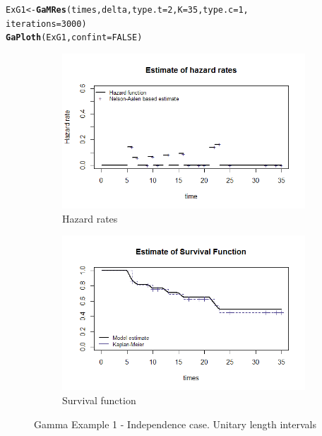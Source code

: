 \documentclass[letterpaper]{article}\usepackage[]{graphicx}\usepackage[]{color}
\makeatletter
\newcommand{\hlnum}[1]{\textcolor[rgb]{0.686,0.059,0.569}{#1}}%
\newcommand{\hlstd}[1]{\textcolor[rgb]{0.345,0.345,0.345}{#1}}%
\newcommand{\hlkwb}[1]{\textcolor[rgb]{0.69,0.353,0.396}{#1}}%
\newcommand{\hlkwc}[1]{\textcolor[rgb]{0.333,0.667,0.333}{#1}}%
\newcommand{\hlkwd}[1]{\textcolor[rgb]{0.737,0.353,0.396}{\textbf{#1}}}%
\newenvironment{kframe}{%
 \def\at@end@of@kframe{}%
 \ifinner\ifhmode%
  \def\at@end@of@kframe{\end{minipage}}%
  \begin{minipage}{\columnwidth}%
 \fi\fi%
 \def\FrameCommand##1{\hskip\@totalleftmargin \hskip-\fboxsep
 \colorbox{shadecolor}{##1}\hskip-\fboxsep
     \hskip-\linewidth \hskip-\@totalleftmargin \hskip\columnwidth}%
 \MakeFramed {\advance\hsize-\width
   \@totalleftmargin\z@ \linewidth\hsize
   \@setminipage}}%
 {\par\unskip\endMakeFramed%
 \at@end@of@kframe}
\newenvironment{knitrout}{}{} %
\makeatother
\begin{document}
\begin{knitrout}
\color{fgcolor}\begin{kframe}
\begin{alltt}
\hlstd{ExG1} \hlkwb{<-} \hlkwd{GaMRes}\hlstd{(times, delta,} \hlkwc{type.t} \hlstd{=} \hlnum{2}\hlstd{,} \hlkwc{K} \hlstd{=} \hlnum{35}\hlstd{,} \hlkwc{type.c} \hlstd{=} \hlnum{1}\hlstd{,}
               \hlkwc{iterations} \hlstd{=} \hlnum{3000}\hlstd{)}
\hlkwd{GaPloth}\hlstd{(ExG1,} \hlkwc{confint} \hlstd{=} \hlnum{FALSE}\hlstd{)}
\end{alltt}
\end{kframe}
\end{knitrout}
\begin{figure}
  \centering
  \begin{subfigure}[a]{\textwidth}\centering
    \includegraphics[width=\textwidth]{G11.png}
    \caption{Hazard rates}
  \end{subfigure}
  \begin{subfigure}[b]{\textwidth}\centering
    \includegraphics[width=\textwidth]{G12.png}
    \caption{Survival function}
  \end{subfigure}
  \caption{Gamma Example 1 - Independence case. Unitary length intervals}
  \label{fig:G1}
\end{figure}
\end{document}
